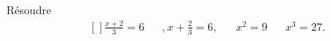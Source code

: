 
\begin{exercice}\label{exoSeconde-0015}

Résoudre
\begin{equation}
    \begin{aligned}[]
        \frac{ x+2 }{ 3 }=6&&,x+\frac{ 2 }{ 3 }=6,&&x^2=9&&x^3=27.
    \end{aligned}
\end{equation}

\end{exercice}
